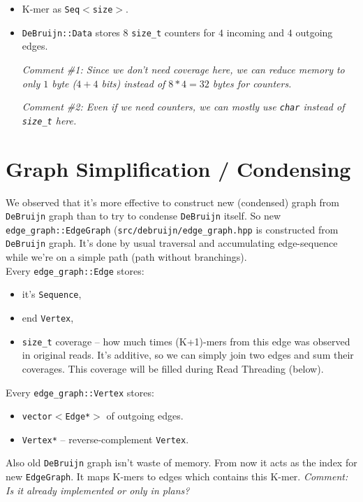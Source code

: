 \documentclass[14pt]{article}
\begin{document}
\begin{itemize}
\item K-mer as \texttt{Seq$<$size$>$}.
\item \texttt{DeBruijn::Data} stores 8 \texttt{size\_t} counters for $4$ incoming and $4$ outgoing edges.

\textit{Comment \#1: Since we don't need coverage here, we can reduce memory to only $1$ byte ($4+4$ bits) instead of $8*4=32$ bytes for counters.}
 
\textit{Comment \#2: Even if we need counters, we can mostly use \texttt{char} instead of \texttt{size\_t} here.}
\end{itemize}

\section{Graph Simplification / Condensing}

We observed that it's more effective to construct new (condensed) graph from \texttt{DeBruijn} graph than to try to condense \texttt{DeBruijn} itself. So new \texttt{edge\_graph::EdgeGraph} (\texttt{src/debruijn/edge\_graph.hpp} is constructed from \texttt{DeBruijn} graph. It's done by usual traversal and accumulating edge-sequence while we're on a simple path (path without branchings). \\

Every \texttt{edge\_graph::Edge} stores:
\begin{itemize}
\item it's \texttt{Sequence},
\item end \texttt{Vertex},
\item \texttt{size\_t} coverage -- how much times (K+1)-mers from this edge was observed in original reads. It's additive, so we can simply join two edges and sum their coverages. This coverage will be filled during Read Threading (below).
\end{itemize} \vspace{.5 cm}

Every \texttt{edge\_graph::Vertex} stores:
\begin{itemize}
\item \texttt{vector$<$Edge*$>$} of outgoing edges.
\item \texttt{Vertex*} -- reverse-complement \texttt{Vertex}.
\end{itemize} \vspace{.5 cm}

Also old \texttt{DeBruijn} graph isn't waste of memory. From now it acts as the index for new \texttt{EdgeGraph}. It maps K-mers to edges which contains this K-mer. \textit{Comment: Is it already implemented or only in plans?}
 
\end{document}
